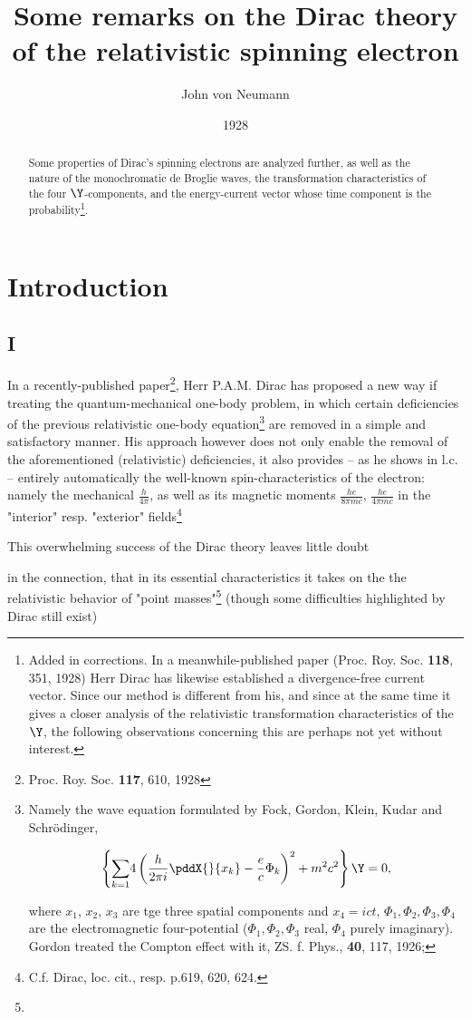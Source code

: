 \documentclass{article}
\title{Some remarks on the Dirac theory of the relativistic spinning electron}
\author{John von Neumann}
\date{1928}
\newcommand{\uequ}[1]{
\begin{align*}
#1
\end{align*}
}
\newcommand{\sumX}[1]{\underset{#1}{\sum}}
\begin{document}
\maketitle

\begin{abstract}
Some properties of Dirac's spinning electrons are analyzed further, as well as the nature of the monochromatic de Broglie waves, the transformation characteristics of the four $\Y$-components, and the energy-current vector whose time component is the probability\footnote{Added in corrections. In a meanwhile-published paper (Proc. Roy. Soc. \textbf{118}, 351, 1928) Herr Dirac has likewise established a divergence-free current vector. Since our method is different from his, and since at the same time it gives a closer analysis of the relativistic transformation characteristics of the $\Y$, the following observations concerning this are perhaps not yet without interest.}.
\end{abstract}

\section*{Introduction}

\subsection*{I}

In a recently-published paper\footnote{Proc. Roy. Soc. \textbf{117}, 610, 1928}, Herr P.A.M. Dirac has proposed a new way if treating the quantum-mechanical one-body problem, in which certain deficiencies of the previous relativistic one-body equation\footnote{Namely the wave equation formulated by Fock, Gordon, Klein, Kudar and Schr\"odinger,
\uequ{
\left\{\sumX{k=1}{4}\left(\frac{h}{2\pi i} \pddX{}{x_k} - \frac{e}{c}\Phi_k\right)^2 + m^2 c^2\right\}\Y = 0,
}
where $x_1$, $x_2$, $x_3$ are tge three spatial components and $x_4=ict$, $\Phi_1,\Phi_2,\Phi_3,\Phi_4$ are the electromagnetic four-potential ($\Phi_1,\Phi_2,\Phi_3$ real, $\Phi_4$ purely imaginary). Gordon treated the Compton effect with it, ZS. f. Phys., \textbf{40}, 117, 1926; } are removed in a simple and satisfactory manner. His approach however does not only enable the removal of the aforementioned (relativistic) deficiencies, it also provides -- as he shows in l.c. -- entirely automatically the well-known spin-characteristics of the electron: namely the mechanical  $\frac{h}{4\pi}$, as well as its magnetic moments $\frac{he}{8\pi mc}$, $\frac{he}{4\pi mc}$ in the "interior" resp. "exterior" fields\footnote{C.f. Dirac, loc. cit., resp. p.619, 620, 624.}

This overwhelming success of the Dirac theory leaves little doubt

in the connection, that in its essential characteristics it takes on the the relativistic
behavior of "point masses"\footnote{} (though some difficulties highlighted by Dirac still exist)
\end{document}
